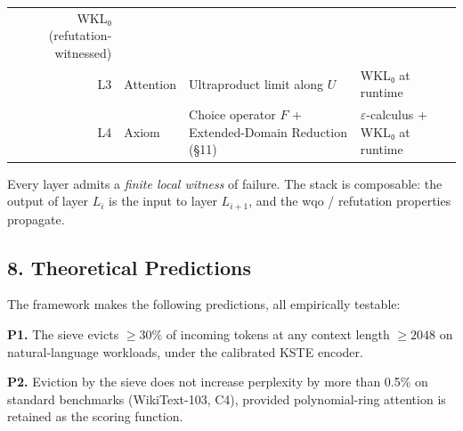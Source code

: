 \documentclass[
  11pt,
]{article}
\begin{document}
\begin{longtable}[]{@{}rlll@{}}
\begin{minipage}[t]{0.42\columnwidth}
WKL₀ (refutation-witnessed)\strut
\end{minipage}\tabularnewline
\begin{minipage}[t]{0.13\columnwidth}\raggedleft
L3\strut
\end{minipage} & \begin{minipage}[t]{0.14\columnwidth}\raggedright
Attention\strut
\end{minipage} & \begin{minipage}[t]{0.20\columnwidth}\raggedright
Ultraproduct limit along \(U\)\strut
\end{minipage} & \begin{minipage}[t]{0.42\columnwidth}\raggedright
WKL₀ at runtime\strut
\end{minipage}\tabularnewline
\begin{minipage}[t]{0.13\columnwidth}\raggedleft
L4\strut
\end{minipage} & \begin{minipage}[t]{0.14\columnwidth}\raggedright
Axiom\strut
\end{minipage} & \begin{minipage}[t]{0.20\columnwidth}\raggedright
Choice operator \(F\) + Extended-Domain Reduction (§11)\strut
\end{minipage} & \begin{minipage}[t]{0.42\columnwidth}\raggedright
\(\varepsilon\)-calculus + WKL₀ at runtime\strut
\end{minipage}\tabularnewline
\bottomrule
\end{longtable}

Every layer admits a \emph{finite local witness} of failure. The stack
is composable: the output of layer \(L_i\) is the input to layer
\(L_{i+1}\), and the wqo / refutation properties propagate.

\hypertarget{theoretical-predictions}{%
\subsection{8. Theoretical Predictions}\label{theoretical-predictions}}

The framework makes the following predictions, all empirically testable:

\textbf{P1.} The sieve evicts \(\ge 30\%\) of incoming tokens at any
context length \(\ge 2048\) on natural-language workloads, under the
calibrated KSTE encoder.

\textbf{P2.} Eviction by the sieve does not increase perplexity by more
than 0.5\% on standard benchmarks (WikiText-103, C4), provided
polynomial-ring attention is retained as the scoring function.
\end{document}
